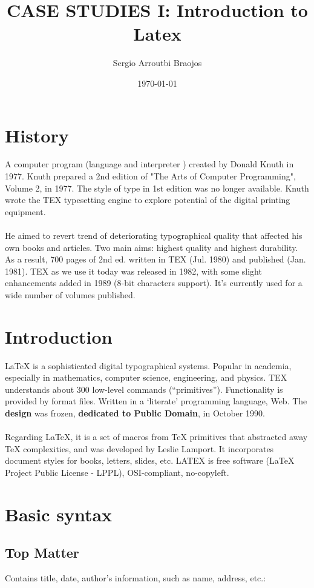 \documentclass[11pt]{article}
\title{\textbf{CASE STUDIES I: Introduction to Latex}}
\author{Sergio Arroutbi Braojos}
\date{\today}
\begin{document}
\maketitle

\section{History}

A computer program (language and interpreter ) created by Donald Knuth in 1977. Knuth prepared a 2nd edition of "The Arts of Computer Programming", Volume 2, in 1977.
The style of type in 1st edition was no longer available. Knuth wrote the TEX typesetting engine to explore potential of the digital printing equipment.\\
\\
He aimed to revert trend of deteriorating typographical quality that affected his own books and articles. Two main aims: highest quality and highest durability. As a result, 700 pages of 2nd ed. written in TEX (Jul. 1980) and published (Jan. 1981). TEX as we use it today was released in 1982, with some slight enhancements added in 1989 (8-bit characters support). It’s currently used for a wide number of volumes published.
\\
\section{Introduction}

LaTeX is a sophisticated digital typographical systems. Popular in academia, especially in mathematics, computer science, engineering, and physics. TEX understands about 300 low-level commands (“primitives”). Functionality is provided by format files. Written in a ‘literate’ programming language, Web. The \textbf{design} was frozen, \textbf{dedicated to Public Domain}, in October 1990.\\
\\
Regarding LaTeX, it is a set of macros from TeX primitives that abstracted away TeX complexities, and was developed by Leslie Lamport. It incorporates document styles for books, letters, slides, etc. LATEX is free software (LaTeX Project Public License - LPPL), OSI-compliant, no-copyleft.
\\
\section{Basic syntax}

\subsection{Top Matter}
Contains title, date, author's information, such as name, address, etc.:
\end{document}
